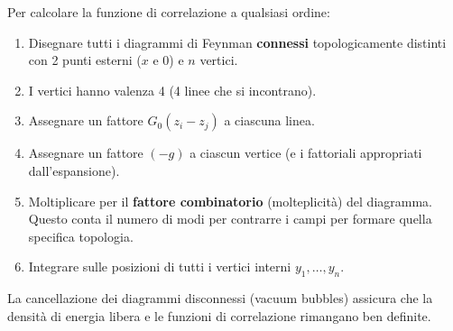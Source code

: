 Per calcolare la funzione di correlazione a qualsiasi ordine:

\begin{enumerate}
    \item Disegnare tutti i diagrammi di Feynman \textbf{connessi} topologicamente distinti con 2 punti esterni ($x$ e $0$) e $n$ vertici.
   
    \item I vertici hanno valenza 4 (4 linee che si incontrano).
    \item Assegnare un fattore $G_0(z_i - z_j)$ a ciascuna linea.
   
    \item Assegnare un fattore $(-g)$ a ciascun vertice (e i fattoriali appropriati dall'espansione).
   
    \item Moltiplicare per il \textbf{fattore combinatorio} (molteplicità) del diagramma.
    Questo conta il numero di modi per contrarre i campi per formare quella specifica topologia.
   
    \item Integrare sulle posizioni di tutti i vertici interni $y_1, \dots, y_n$.
   
\end{enumerate}

La cancellazione dei diagrammi disconnessi (vacuum bubbles) assicura che la densità di energia libera e le funzioni di correlazione rimangano ben definite.

